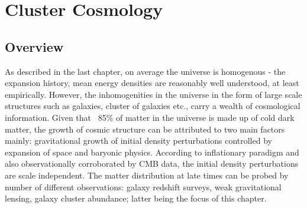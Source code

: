 \chapter{Cluster Cosmology}
\label{ch:clusters}
\section{Overview}
As described in the last chapter, on average the universe is homogenous - the expansion history, mean energy densities are reasonably well understood, at least empirically. However, the inhomogenities in the universe in the form of large scale structures such as galaxies, cluster of galaxies etc., carry a wealth of cosmological information. Given that ~85\% of matter in the universe is made up of cold dark matter, the growth of cosmic structure can be attributed to two main factors mainly: gravitational growth of initial density perturbations controlled by expansion of space and baryonic physics. According to inflationary paradigm and also observationally corroborated by CMB data, the initial density perturbations are scale independent. The matter distribution at late times can be probed by number of different observations: galaxy redshift surveys, weak gravitational lensing, galaxy cluster abundance; latter being the focus of this chapter.  %

